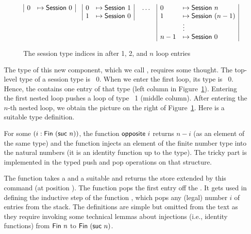 \documentclass[acmsmall,review,anonymous,screen]{acmart}
\begin{document}
\begin{figure}[tp]
  \begin{align*}
    &
      \begin{array}[t]{|ll|}
        0 &\mapsto \ASession~0
      \end{array}
    &&
      \begin{array}[t]{|ll|}
        0 &\mapsto \ASession~1 \\
        1 &\mapsto \ASession~0
      \end{array}
          &&
             \dots
    &&
       \begin{array}[t]{|ll|}
         0 & \mapsto \ASession~n \\
         1 & \mapsto \ASession~(n-1) \\
           & \vdots \\
         n-1 & \mapsto \ASession~0
       \end{array}
  \end{align*}
  \caption{The session type indices in {\ACommandStack} after 1, 2, and $n$ loop entries}
  \label{fig:commandstore}
\end{figure}
The type of this new
component, which we call {\ACommandStack}, requires some thought.  The top-level type of a session type is
{\ASession~0}. When we enter the first loop, its type is {\ASession~0}. Hence, the {\ACommandStack} contains
one entry of that type (left column in Figure~\ref{fig:commandstore}).
Entering the first nested loop pushes a loop of type {\ASession~1}
(middle column). After entering the $n$-th nested loop, we obtain the
picture on the right of Figure~\ref{fig:commandstore}. Here is a
suitable type definition.
\rstCommandStack

For some $(i : \AFin~(\Asuc~ n))$, the function
$\AgdaFunction{opposite}~i$ returns $n-i$ (as an element of the same
type) and the function {\AtoN} injects an element of the finite number
type into the natural numbers (it is an identity function up to the type). The tricky part is implemented in the
typed push and pop operations on that structure.
\rstPops

The  function takes a {\ACommandStack} and a
suitable {\ACommand} and returns the store extended by this command
(at position {\Azero}). 
The  function pops the first entry off the
{\ACommandStack}. It gets used in defining the inductive step of the
function , which pops any (legal) number $i$ of entries
from the stack. The definitions are simple but omitted from the text
as they require invoking some technical lemmas about injections (i.e.,
identity functions) from $\AFin~n$ to $\AFin~(\Asuc~n)$.
\end{document}
